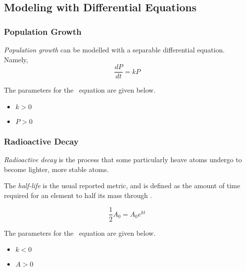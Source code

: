 	\subsection{Modeling with Differential Equations} \label{subsec:Modeling with DEs}
		\subsubsection{Population Growth} \label{subsubsec:Population Growth}
			\begin{definition}
				\emph{Population growth} can be modelled with a separable differential equation. Namely,
				\begin{equation} \label{eq:Population Growth}
					\frac{dP}{dt} = kP
				\end{equation}
				\begin{remark} \label{rmk:Population Growth Parameters}
					The parameters for the ~equation are given below.
					\begin{itemize}[noitemsep, nolistsep]
						\item $k>0$
						\item $P>0$
					\end{itemize}
				\end{remark}
			\end{definition}
		\subsubsection{Radioactive Decay} \label{subsubsec:Radioactive Decay}
			\begin{definition} \label{def:Radioactive Decay}
				\emph{Radioactive decay} is the process that some particularly heave atoms undergo to become lighter, more stable atoms.
				\begin{definition} \label{subdef:Half-Life}
					The \emph{half-life} is the usual reported metric, and is defined as the amount of time required for an element to half its mass through .
				\end{definition}
				\begin{equation} \label{eq:Radioactive Decay}
					\frac{1}{2} A_{0} = A_{0} e^{kt}
				\end{equation}
				\begin{remark} \label{rmk:Radioactive Decay Parameters}
					The parameters for the ~equation are given below.
					\begin{itemize}[noitemsep, nolistsep]
						\item $k<0$
						\item $A>0$
					\end{itemize}
				\end{remark}
			\end{definition}
